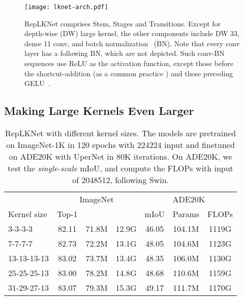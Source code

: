 \documentclass[10pt,twocolumn,letterpaper]{article}
\begin{document}
		\begin{figure}
		\begin{center}
			\texttt{[image: lknet-arch.pdf]}
			\vspace{-0.3in}
			\caption{RepLKNet comprises Stem, Stages and Transitions. Except for depth-wise (DW) large kernel, the other components include DW 33, dense 11 conv, and batch normalization~\cite{ioffe2015batch} (BN). Note that every conv layer has a following BN, which are not depicted. Such conv-BN sequences use ReLU as the activation function, except those before the shortcut-addition (as a common practice \cite{he2016deep,mbv2}) and those preceding GELU~\cite{hendrycks2016gaussian}.}
			\label{fig-lknet-arch}
			\vspace{-0.2in}
		\end{center}
	\end{figure}
	
	
	\subsection{Making Large Kernels Even Larger}\label{sect-replknet-120}
	
	\setlength{\tabcolsep}{3pt}
	\begin{table}
		\caption{RepLKNet with different kernel sizes. The models are pretrained on ImageNet-1K in 120 epochs with 224224 input and finetuned on ADE20K with UperNet in 80K iterations. On ADE20K, we test the \emph{single-scale} mIoU, and compute the FLOPs with input of 2048512, following Swin.}
		\label{table-replknet-224}
		\vspace{-0.25in}
		\begin{center}		
			\small
			\begin{tabular}{l|ccc|ccc}
				\hline
				& \multicolumn{3}{c|}{ImageNet} & \multicolumn{3}{c}{ADE20K} \\
				Kernel size		&	Top-1		& \makecell{Params}		&\makecell{FLOPs}	&	mIoU	& Params	& FLOPs	\\
				\hline
				3-3-3-3         &   82.11           &   71.8M       &   12.9G   &   46.05   &   104.1M  &   1119G\\
				7-7-7-7         &   82.73           &   72.2M       &   13.1G   &   48.05   &   104.6M  &   1123G\\
				13-13-13-13		&	83.02			&	73.7M		&	13.4G	&   48.35   &   106.0M  &   1130G\\ 
				25-25-25-13		&	83.00			&	78.2M       &   14.8G	&   48.68   &   110.6M  &   1159G\\
				31-29-27-13     &   83.07           &   79.3M       &   15.3G   &   49.17   &   111.7M  &   1170G\\
				\hline
			\end{tabular}
		\end{center}
		\vspace{-0.3in}
	\end{table}
	\setlength{\tabcolsep}{1.4pt}
	
\end{document}
